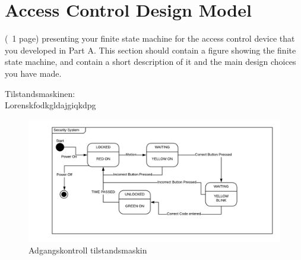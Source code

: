 \section{Access Control Design Model}
\label{sec:background}

(~1 page) presenting your finite state machine for the access control device that you developed in Part A. This section should contain a figure showing the finite state machine, and contain a short description of it and the main design choices you have made.


Tilstandsmaskinen: \\

Lorenskfodkgldajgiqkdpg



\begin{figure}[H]
  \centering
  \includegraphics[scale=0.75]{figs/StateMachine.png}
  \caption{Adgangskontroll tilstandsmaskin}
  \label{fig:StateMachine}
\end{figure}

\pagebreak